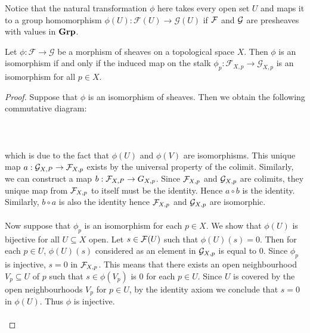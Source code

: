 \documentclass[a4paper]{article}
\begin{document}
Notice that the natural transformation $\phi$ here takes every open set $U$ and maps it to a group homomorphism $\phi(U):\mathcal{F}(U)\to\mathcal{G}(U)$ if $\mathcal{F}$ and $\mathcal{G}$ are presheaves with values in $\bold{Grp}$. 

\begin{prp}{}{} Let $\phi:\mathcal{F}\to\mathcal{G}$ be a morphism of sheaves on a topological space $X$. Then $\phi$ is an isomorphism if and only if the induced map on the stalk $\phi_p:\mathcal{F}_{X,p}\to\mathcal{G}_{X,p}$ is an isomorphism for all $p\in X$. \tcbline
\begin{proof}
Suppose that $\phi$ is an isomorphism of sheaves. Then we obtain the following commutative diagram: \\~\\
 \\~\\
which is due to the fact that $\phi(U)$ and $\phi(V)$ are isomorphisms. This unique map $a:\mathcal{G}_{X,P}\to\mathcal{F}_{X,p}$ exists by the universal property of the colimit. Similarly, we can construct a map $b:\mathcal{F}_{X,P}\to G_{X,p}$. Since $\mathcal{F}_{X,p}$ and $\mathcal{G}_{X,p}$ are colimits, they unique map from $\mathcal{F}_{X,p}$ to itself must be the identity. Hence $a\circ b$ is the identity. Similarly, $b\circ a$ is also the identity hence $\mathcal{F}_{X,p}$ and $\mathcal{G}_{X,p}$ are isomorphic. \\~\\

Now suppose that $\phi_p$ is an isomorphism for each $p\in X$. We show that $\phi(U)$ is bijective for all $U\subseteq X$ open. Let $s\in\mathcal{F}(U)$ such that $\phi(U)(s)=0$. Then for each $p\in U$, $\phi(U)(s)$ considered as an element in $\mathcal{G}_{X,p}$ is equal to $0$. Since $\phi_p$ is injective, $s=0$ in $\mathcal{F}_{X,p}$. This means that there exists an open neighbourhood $V_p\subseteq U$ of $p$ such that $s\in\phi(V_p)$ is $0$ for each $p\in U$. Since $U$ is covered by the open neighbourhoods $V_p$ for $p\in U$, by the identity axiom we conclude that $s=0$ in $\phi(U)$. Thus $\phi$ is injective. \\~\\


\end{proof}
\end{prp}
\end{document}
